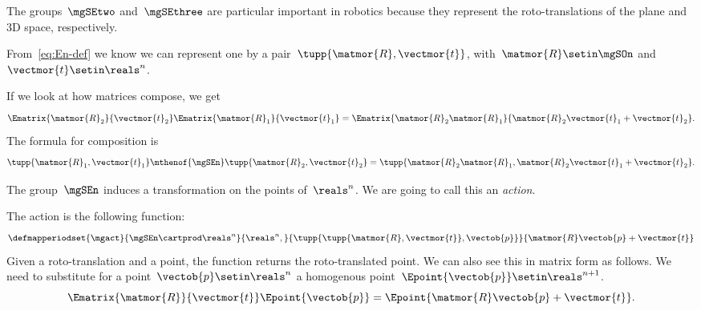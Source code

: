 The groups~$\mgSEtwo$ and~$\mgSEthree$ are particular important in robotics because they represent the roto-translations of the plane and 3D space, respectively.

From~\cref{eq:En-def} we know we can represent one by a pair~$\tupp{\matmor{R}, \vectmor{t}}$, with~$\matmor{R}\setin\mgSOn$ and~$\vectmor{t} \setin \reals^n$.

If we look at how matrices compose, we get
%
\begin{equation}
    \label{eq:SE-composition}
    \Ematrix{\matmor{R}_2}{\vectmor{t}_2} \Ematrix{\matmor{R}_1}{\vectmor{t}_1} = \Ematrix{\matmor{R}_2 \matmor{R}_1}{\matmor{R}_2\vectmor{t}_1 + \vectmor{t}_2}.
\end{equation}
%
The formula for composition is
%
\begin{equation}
    \label{eq:SE-composition-short}
    \tupp{\matmor{R}_1, \vectmor{t}_1} \mthenof{\mgSEn} \tupp{\matmor{R}_2, \vectmor{t}_2}  = \tupp{\matmor{R}_2 \matmor{R}_1, \matmor{R}_2 \vectmor{t}_1 + \vectmor{t}_2}.
\end{equation}
%

%

The group~$\mgSEn$ induces a transformation on the points of~$\reals^n$.
We are going to call this an \emph{action}.

The action is the following function:
%
\begin{equation}
    \label{eq:apply}
    \defmapperiodset{\mgact}{
        \mgSEn \cartprod \reals^n
    }{
        \reals^n,
    }{
        \tupp{ \tupp{\matmor{R}, \vectmor{t}}, \vectob{p}}
    }{
        \matmor{R}\vectob{p} + \vectmor{t}
    }
\end{equation}
Given a roto-translation and a point, the function returns the roto-translated point.
%
We can also see this in matrix form as follows.
We need to substitute for a point~$\vectob{p} \setin \reals^n$ a homogenous point~$\Epoint{\vectob{p}} \setin \reals^{n+1}$.
%
\begin{equation}
    \label{eq:homogenous}
    \Ematrix{\matmor{R}}{\vectmor{t}}
    \Epoint{\vectob{p}}
    =
    \Epoint{\matmor{R}\vectob{p} + \vectmor{t}}.
\end{equation}
%

